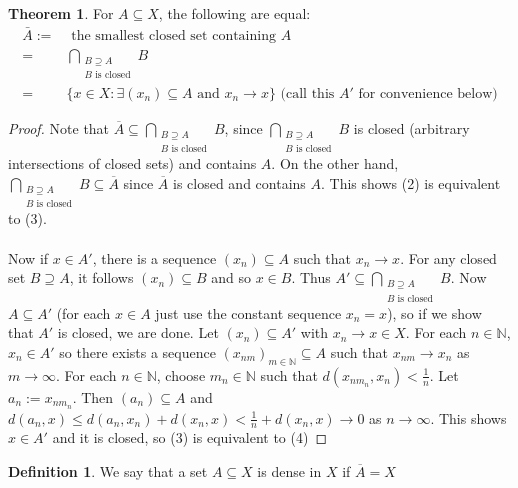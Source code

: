 \documentclass[11pt,a4paper]{article}
\theoremstyle{definition}
\newtheorem{definition}{Definition}[section]
\newtheorem{theorem}{Theorem}[section]
\begin{document}
\begin{theorem}
    For $A \subseteq X$, the following are equal:
    \begin{align}
        \bar{A}  := & \text{ the smallest closed set containing } A \\
        = &  \bigcap \limits _{\substack{B \supseteq A \\ B\text{ is closed}}}B \\
        =&\{x \in X: \exists (x_n) \subseteq A \text{ and } x_n \to x\} \text{ (call this } A' \text{ for convenience below)}
    \end{align}
\end{theorem}
\begin{proof}
    Note that $\overline{A} \subseteq \bigcap \limits _{\substack{B \supseteq A \\ B\text{ is closed}}}B$, since $\bigcap \limits _{\substack{B \supseteq A \\ B\text{ is closed}}}B$ is closed (arbitrary intersections of closed sets) and contains $A$. On the other hand, $\bigcap \limits _{\substack{B \supseteq A \\ B\text{ is closed}}}B \subseteq \overline{A}$ since $\overline{A}$ is closed and contains $A$. This shows (2) is equivalent to (3). \\ ~\\ Now if $x \in A'$, there is a sequence $(x_n) \subseteq A$ such that $x_n \to x$. For any closed set $B \supseteq A$, it follows $(x_n) \subseteq B$ and so $x \in B$. Thus $A' \subseteq \bigcap \limits _{\substack{B \supseteq A \\ B\text{ is closed}}}B$. Now $A \subseteq A'$ (for each $x\in A$ just use the constant sequence $x_n = x$), so if we show that $A'$ is closed, we are done. Let $(x_n) \subseteq A'$ with $x_n \to x\in X$. For each $n\in \mathbb{N}$, $x_n \in A'$ so there exists a sequence $(x_{nm})_{m \in \mathbb{N}} \subseteq A$ such that $x_{nm} \to x_n$ as $m\to \infty$. For each $n\in \mathbb{N}$, choose $m_n \in \mathbb{N}$ such that $d(x_{nm_n}, x_n) < \frac{1}{n}$. Let $a_n := x_{nm_n}$. Then $(a_n) \subseteq A$ and $d(a_n, x) \le d(a_n, x_n) + d(x_n, x) < \frac{1}{n} + d(x_n, x) \to 0$ as $n \to \infty$. This shows $x \in A'$ and it is closed, so (3) is equivalent to (4)
\end{proof}

\begin{definition}
    We say that a set $A \subseteq X$ is dense in $X$ if $\overline{A} = X$
\end{definition}
\end{document}
